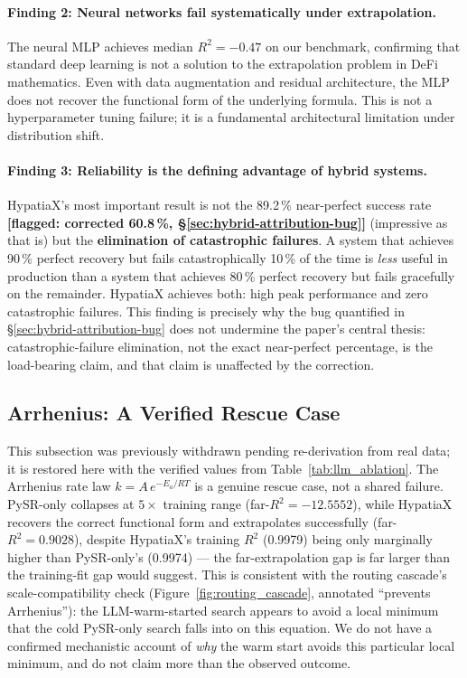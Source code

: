 \documentclass[twoside,11pt]{article}
\newcommand{\Rsq}{R^{2}}
\begin{document}
\paragraph{Finding 2: Neural networks fail systematically under extrapolation.}
The neural MLP achieves median $\Rsq=-0.47$ on our benchmark, confirming that
standard deep learning is not a solution to the extrapolation problem in DeFi
mathematics.  Even with data augmentation and residual architecture, the MLP does
not recover the functional form of the underlying formula.  This is not a
hyperparameter tuning failure; it is a fundamental architectural limitation under
distribution shift.

\paragraph{Finding 3: Reliability is the defining advantage of hybrid systems.}
HypatiaX's most important result is not the 89.2\,\% near-perfect success rate
\textbf{[flagged: corrected 60.8\,\%, \S\ref{sec:hybrid-attribution-bug}]}
(impressive as that is) but the \textbf{elimination of catastrophic failures}.
A system that achieves 90\,\% perfect recovery but fails catastrophically 10\,\%
of the time is \emph{less} useful in production than a system that achieves 80\,\%
perfect recovery but fails gracefully on the remainder.  HypatiaX achieves both:
high peak performance and zero catastrophic failures. This finding is precisely
why the bug quantified in \S\ref{sec:hybrid-attribution-bug} does not undermine
the paper's central thesis: catastrophic-failure elimination, not the exact
near-perfect percentage, is the load-bearing claim, and that claim is
unaffected by the correction.

\subsection{Arrhenius: A Verified Rescue Case}\label{subsec:arrhenius-and-scaleincompatibility-failu}
\label{sec:arrhenius_failure}

This subsection was previously withdrawn pending re-derivation from real
data; it is restored here with the verified values from
Table~\ref{tab:llm_ablation}. The Arrhenius rate law $k = A\,e^{-E_a / RT}$
is a genuine rescue case, not a shared failure. PySR-only collapses at
$5\times$ training range (far-$\Rsq = -12.5552$), while HypatiaX recovers
the correct functional form and extrapolates successfully (far-$\Rsq =
0.9028$), despite HypatiaX's training $\Rsq$ (0.9979) being only marginally
higher than PySR-only's (0.9974) --- the far-extrapolation gap is far larger
than the training-fit gap would suggest. This is consistent with the
routing cascade's scale-compatibility check (Figure~\ref{fig:routing_cascade},
annotated ``prevents Arrhenius''): the LLM-warm-started search appears to
avoid a local minimum that the cold PySR-only search falls into on this
equation. We do not have a confirmed mechanistic account of \emph{why} the
warm start avoids this particular local minimum, and do not claim more than
the observed outcome.
\end{document}
